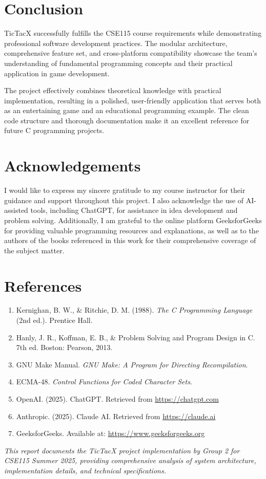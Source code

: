 \documentclass[12pt]{article}
\begin{document}
\section{Conclusion}

TicTacX successfully fulfills the CSE115 course requirements while demonstrating professional software development practices. The modular architecture, comprehensive feature set, and cross-platform compatibility showcase the team's understanding of fundamental programming concepts and their practical application in game development.

The project effectively combines theoretical knowledge with practical implementation, resulting in a polished, user-friendly application that serves both as an entertaining game and an educational programming example. The clean code structure and thorough documentation make it an excellent reference for future C programming projects.

\section*{Acknowledgements}
I would like to express my sincere gratitude to my course instructor for their guidance and support throughout this project. 
I also acknowledge the use of AI-assisted tools, including ChatGPT, for assistance in idea development and problem solving. 
Additionally, I am grateful to the online platform GeeksforGeeks for providing valuable programming resources and explanations, 
as well as to the authors of the books referenced in this work for their comprehensive coverage of the subject matter.

\section{References}

\begin{enumerate}
    \item Kernighan, B. W., \& Ritchie, D. M. (1988). \textit{The C Programming Language} (2nd ed.). Prentice Hall.
    \item Hanly, J. R., Koffman, E. B., \& Problem Solving and Program Design in C. 7th ed. Boston: Pearson, 2013.
    \item GNU Make Manual. \textit{GNU Make: A Program for Directing Recompilation}.
    \item ECMA-48. \textit{Control Functions for Coded Character Sets}.
    \item OpenAI. (2025). ChatGPT. Retrieved from \url{https://chatgpt.com}
    \item Anthropic. (2025). Claude AI. Retrieved from \url{https://claude.ai}
    \item GeeksforGeeks. Available at: \url{https://www.geeksforgeeks.org}
\end{enumerate}

\vfill
\textit{This report documents the TicTacX project implementation by Group 2 for CSE115 Summer 2025, providing comprehensive analysis of system architecture, implementation details, and technical specifications.}
\end{document}
